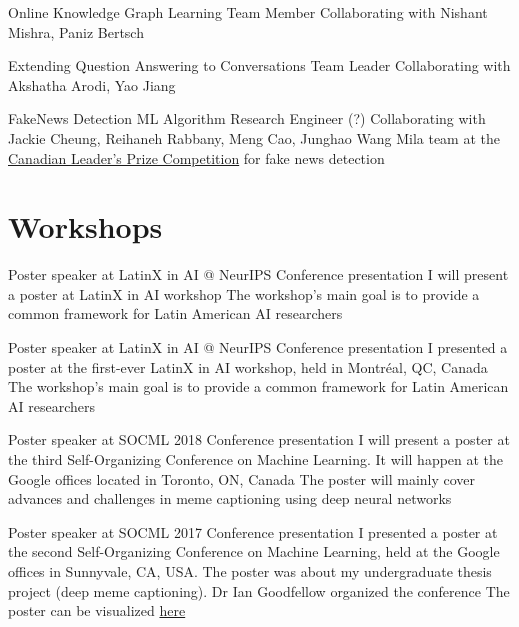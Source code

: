 \documentclass[8pt,a4paper,sans]{moderncv} %
\begin{document}
        {Online Knowledge Graph Learning}
        {Team Member}
        {Collaborating with Nishant Mishra, Paniz Bertsch}
        {}
        {}

        {Extending Question Answering to Conversations}
        {Team Leader}
        {Collaborating with Akshatha Arodi, Yao Jiang}
        {}
        {}

        {FakeNews Detection}
        {ML Algorithm Research Engineer (?)}
        {Collaborating with Jackie Cheung, Reihaneh Rabbany, Meng Cao, Junghao Wang}
        {Mila team at the \href{https://leadersprize.truenorthwaterloo.com/en/}{Canadian Leader's Prize Competition}
         for fake news detection}
        {}

\section{Workshops}

        {Poster speaker at LatinX in AI @ NeurIPS}
        {Conference presentation}
        {I will present a poster at LatinX in AI workshop}
        {The workshop's main goal is to provide a common framework for Latin American AI researchers}
        {}

        {Poster speaker at LatinX in AI @ NeurIPS}
        {Conference presentation}
        {I presented a poster at the first-ever LatinX in AI workshop, held in Montréal, QC, Canada}
        {The workshop's main goal is to provide a common framework for Latin American AI researchers}
        {}

        {Poster speaker at SOCML 2018}
        {Conference presentation}
        {I will present a poster at the third Self-Organizing Conference on Machine Learning. It will happen at the Google offices located in Toronto, ON, Canada}
        {The poster will mainly cover advances and challenges in meme captioning using deep neural networks}
        {}

        {Poster speaker at SOCML 2017}
        {Conference presentation}
        {I presented a poster at the second Self-Organizing Conference on Machine Learning, held at the Google offices in Sunnyvale, CA, USA. The poster was about my undergraduate thesis project (deep meme captioning). Dr Ian Goodfellow organized the conference}
        {The poster can be visualized \href{https://drive.google.com/file/d/1DPjqiXcmliwPZBOfBIXxnIX_rs9EPUub/view?usp=sharing}{here}}
        {}
\end{document}

